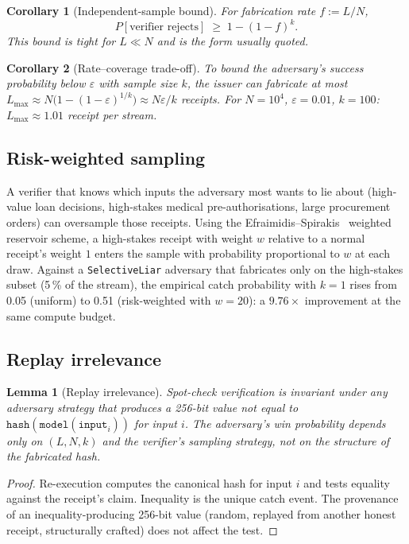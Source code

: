 \documentclass[10pt]{article}
\newtheorem{lemma}{Lemma}
\newtheorem{corollary}{Corollary}
\begin{document}
\begin{corollary}[Independent-sample bound]
\label{cor:ind}
For fabrication rate $f := L/N$,
\[
P[\text{verifier rejects}] \;\geq\; 1 - (1-f)^k.
\]
This bound is tight for $L \ll N$ and is the form usually quoted.
\end{corollary}

\begin{corollary}[Rate--coverage trade-off]
To bound the adversary's success probability below $\varepsilon$ with sample size $k$, the issuer can fabricate at most $L_{\max} \approx N\bigl(1 - (1-\varepsilon)^{1/k}\bigr) \approx N\varepsilon/k$ receipts. For $N = 10^4$, $\varepsilon = 0.01$, $k = 100$: $L_{\max} \approx 1.01$ receipt per stream.
\end{corollary}

\subsection{Risk-weighted sampling}

A verifier that knows which inputs the adversary most wants to lie about (high-value loan decisions, high-stakes medical pre-authorisations, large procurement orders) can oversample those receipts. Using the Efraimidis--Spirakis~\cite{esweighted} weighted reservoir scheme, a high-stakes receipt with weight $w$ relative to a normal receipt's weight $1$ enters the sample with probability proportional to $w$ at each draw. Against a \texttt{SelectiveLiar} adversary that fabricates only on the high-stakes subset (5\,\% of the stream), the empirical catch probability with $k=1$ rises from 0.05 (uniform) to 0.51 (risk-weighted with $w=20$): a $9.76\times$ improvement at the same compute budget.

\subsection{Replay irrelevance}

\begin{lemma}[Replay irrelevance]
\label{lem:replay}
Spot-check verification is invariant under any adversary strategy that produces a 256-bit value not equal to $\texttt{hash}(\texttt{model}(\texttt{input}_i))$ for input $i$. The adversary's win probability depends only on $(L, N, k)$ and the verifier's sampling strategy, not on the structure of the fabricated hash.
\end{lemma}

\begin{proof}
Re-execution computes the canonical hash for input $i$ and tests equality against the receipt's claim. Inequality is the unique catch event. The provenance of an inequality-producing 256-bit value (random, replayed from another honest receipt, structurally crafted) does not affect the test.
\end{proof}
\end{document}
